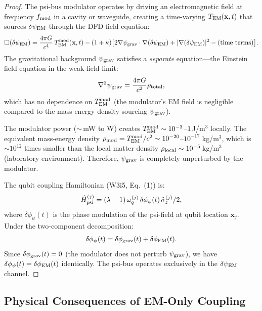 \documentclass[11pt]{article}
\theoremstyle{definition}
\theoremstyle{remark}
\newcommand{\psigrav}{\psi_{\rm grav}}
\newcommand{\dpsiEM}{\delta\psi_{\rm EM}}
\begin{document}
\begin{proof}
The psi-bus modulator operates by driving an electromagnetic field
at frequency $f_{\rm mod}$ in a cavity or waveguide, creating a
time-varying $T_{\rm EM}(\mathbf{x}, t)$ that sources $\dpsiEM$
through the DFD field equation:
\begin{equation}
  \Box(\dpsiEM) = \frac{4\pi G}{c^4}\,T_{\rm EM}^{\rm mod}(\mathbf{x}, t)
  - (1+\kappa)\bigl[2\nabla\psigrav\cdot\nabla(\dpsiEM) + |\nabla(\dpsiEM)|^2
  - \text{(time terms)}\bigr].
  \label{eq:dpsi-em-driven}
\end{equation}
The gravitational background $\psigrav$ satisfies a \emph{separate}
equation---the Einstein field equation in the weak-field limit:
\begin{equation}
  \nabla^2\psigrav = \frac{4\pi G}{c^2}\rho_{\rm total},
  \label{eq:psi-grav-poisson}
\end{equation}
which has no dependence on $T_{\rm EM}^{\rm mod}$ (the modulator's EM
field is negligible compared to the mass-energy density sourcing
$\psigrav$).

The modulator power ($\sim\,$mW to W) creates $T_{\rm EM}^{\rm mod}
\sim 10^{-3}$--$1$\,J/m$^3$ locally.  The equivalent mass-energy density
$\rho_{\rm mod} = T_{\rm EM}^{\rm mod}/c^2 \sim 10^{-20}$--$10^{-17}$
kg/m$^3$, which is $\sim 10^{12}$ times smaller than the local matter
density $\rho_{\rm local} \sim 10^{-5}$\,kg/m$^3$ (laboratory environment).
Therefore, $\psigrav$ is completely unperturbed by the modulator.

The qubit coupling Hamiltonian (W3i5, Eq.~(1)) is:
\begin{equation}
  \hat{H}_{\rm psi}^{(j)} = (\lambda-1)\,\omega_q^{(j)}\,
  \delta\phi_\psi(t)\,\hat\sigma_z^{(j)}/2,
  \label{eq:psi-coupling-w3i5}
\end{equation}
where $\delta\phi_\psi(t)$ is the phase modulation of the psi-field at
qubit location $\mathbf{x}_j$.  Under the two-component decomposition:
\begin{equation}
  \delta\phi_\psi(t) = \delta\phi_{\rm grav}(t) + \delta\phi_{\rm EM}(t).
\end{equation}
Since $\delta\phi_{\rm grav}(t) = 0$ (the modulator does not perturb
$\psigrav$), we have $\delta\phi_\psi(t) = \delta\phi_{\rm EM}(t)$
identically.  The psi-bus operates exclusively in the $\dpsiEM$ channel.
\end{proof}

\subsection{Physical Consequences of EM-Only Coupling}
\label{sec:em-only-consequences}
\end{document}
